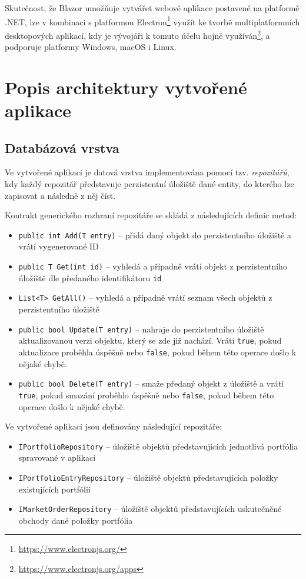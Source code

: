 \documentclass[12pt, a4paper]{article}
\begin{document}
    Skutečnost, že Blazor umožňuje vytvářet webové aplikace postavené na platformě .NET, lze v kombinaci s platformou Electron\footnote{\url{https://www.electronjs.org/}}
    využít ke tvorbě multiplatformních desktopových aplikací, kdy je vývojáři k tomuto účelu hojně využíván\footnote{\url{https://www.electronjs.org/apps}},
    a podporuje platformy Windows, macOS i Linux.

    \section{Popis architektury vytvořené aplikace}

    \subsection{Databázová vrstva}
    Ve vytvořené aplikaci je datová vrstva implementována pomocí tzv. \textit{repozitářů}, kdy každý repozitář představuje perzistentní úložiště dané entity, do kterého lze zapisovat a následně z něj číst.

    Kontrakt generického rozhraní repozitáře se skládá z následujících definic metod:
    \begin{itemize}
        \item \texttt{public int Add(T entry)} -- přidá daný objekt do perzistentního úložiště a vrátí vygenerované ID
        \item \texttt{public T Get(int id)} -- vyhledá a případně vrátí objekt z perzistentního úložiště dle předaného identifikátoru \texttt{id}
        \item \texttt{List<T> GetAll()} -- vyhledá a případně vrátí seznam všech objektů z perzistentního úložiště
        \item \texttt{public bool Update(T entry)} -- nahraje do perzistentního úložiště aktualizovanou verzi objektu, který se zde již nachází. Vrátí \texttt{true}, pokud aktualizace proběhla úspěšně nebo \texttt{false}, pokud během této operace došlo k nějaké chybě.
        \item \texttt{public bool Delete(T entry)} -- smaže předaný objekt z úložiště a vrátí \texttt{true}, pokud smazání proběhlo úspěšně nebo \texttt{false}, pokud během této operace došlo k nějaké chybě.

    \end{itemize}

    \noindent Ve vytvořené aplikaci jsou definovány následující repozitáře:
    \begin{itemize}
        \item \texttt{IPortfolioRepository} -- úložiště objektů představujících jednotlivá portfólia spravované v aplikaci
        \item \texttt{IPortfolioEntryRepository} -- úložiště objektů představujících položky existujících portfólií
        \item \texttt{IMarketOrderRepository} -- úložiště objektů představujících uskutečněné obchody dané položky portfólia
    \end{itemize}
\end{document}
